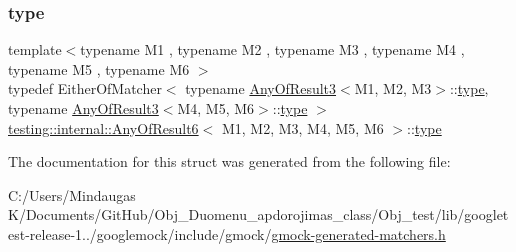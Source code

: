 \subsubsection{\texorpdfstring{type}{type}}
{\footnotesize\ttfamily template$<$typename M1 , typename M2 , typename M3 , typename M4 , typename M5 , typename M6 $>$ \\
typedef Either\+Of\+Matcher$<$ typename \mbox{\hyperlink{structtesting_1_1internal_1_1_any_of_result3}{Any\+Of\+Result3}}$<$M1, M2, M3$>$\+::\mbox{\hyperlink{structtesting_1_1internal_1_1_any_of_result6_a15837eb05d9ac5a76c20d344a4988dd1}{type}}, typename \mbox{\hyperlink{structtesting_1_1internal_1_1_any_of_result3}{Any\+Of\+Result3}}$<$M4, M5, M6$>$\+::\mbox{\hyperlink{structtesting_1_1internal_1_1_any_of_result6_a15837eb05d9ac5a76c20d344a4988dd1}{type}} $>$ \mbox{\hyperlink{structtesting_1_1internal_1_1_any_of_result6}{testing\+::internal\+::\+Any\+Of\+Result6}}$<$ M1, M2, M3, M4, M5, M6 $>$\+::\mbox{\hyperlink{structtesting_1_1internal_1_1_any_of_result6_a15837eb05d9ac5a76c20d344a4988dd1}{type}}}



The documentation for this struct was generated from the following file\+:\begin{DoxyCompactItemize}
\item 
C\+:/\+Users/\+Mindaugas K/\+Documents/\+Git\+Hub/\+Obj\+\_\+\+Duomenu\+\_\+apdorojimas\+\_\+class/\+Obj\+\_\+test/lib/googletest-\/release-\/1../googlemock/include/gmock/\mbox{\hyperlink{_obj__test_2lib_2googletest-release-1_88_81_2googlemock_2include_2gmock_2gmock-generated-matchers_8h}{gmock-\/generated-\/matchers.\+h}}\end{DoxyCompactItemize}
